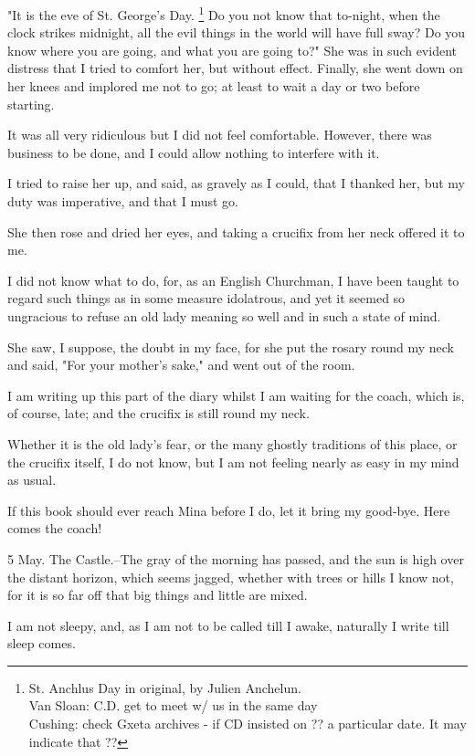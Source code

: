 "It is the eve of St. George's Day.
\footnote{St. Anchlus Day in original, by Julien Anchelun.\\
Van Sloan: C.D. get to meet w/ us in the same day\\
Cushing: check Gxeta archives - if CD insisted on ?? a particular date. It may indicate that ??}
Do you not know that to-night, when the clock strikes midnight, all the evil things in the world will have full sway? Do you know where you are going, and what you are going to?" She was in such evident distress that I tried to comfort her, but without effect. Finally, she went down on her knees and implored me not to go; at least to wait a day or two before starting. 

It was all very ridiculous but I did not feel comfortable. However, there was business to be done, and I could allow nothing to interfere with it. 

I tried to raise her up, and said, as gravely as I could, that I thanked her, but my duty was imperative, and that I must go. 

She then rose and dried her eyes, and taking a crucifix from her neck offered it to me. 

I did not know what to do, for, as an English Churchman, I have been taught to regard such things as in some measure idolatrous, and yet it seemed so ungracious to refuse an old lady meaning so well and in such a state of mind. 

She saw, I suppose, the doubt in my face, for she put the rosary round my neck and said, "For your mother's sake," and went out of the room. 

I am writing up this part of the diary whilst I am waiting for the coach, which is, of course, late; and the crucifix is still round my neck. 

Whether it is the old lady's fear, or the many ghostly traditions of this place, or the crucifix itself, I do not know, but I am not feeling nearly as easy in my mind as usual. 

If this book should ever reach Mina before I do, let it bring my good-bye. Here comes the coach! 

5 May. The Castle.--The gray of the morning has passed, and the sun is high over the distant horizon, which seems jagged, whether with trees or hills I know not, for it is so far off that big things and little are mixed. 

I am not sleepy, and, as I am not to be called till I awake, naturally I write till sleep comes. 

